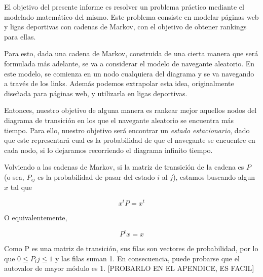 
El objetivo del presente informe es resolver un problema práctico mediante el modelado matemático del mismo. Este problema consiste en modelar páginas web y ligas deportivas con cadenas de Markov, con el objetivo de obtener rankings para ellas.

Para esto, dada una cadena de Markov, construida de una cierta manera que será formulada más adelante, se va a considerar el modelo de navegante aleatorio. En este modelo, se comienza en un nodo cualquiera del diagrama y se va navegando a trav\'es de los links. Además podemos extrapolar esta idea, originalmente diseñada para páginas web, y utilizarla en ligas deportivas.

Entonces, nuestro objetivo de alguna manera es rankear mejor aquellos nodos del diagrama de transición en los que el navegante aleatorio se encuentra más tiempo. Para ello, nuestro objetivo será encontrar un \emph{estado estacionario}, dado que este representará cual es la probabilidad de que el navegante se encuentre en cada nodo, si lo dejaramos recorriendo el diagrama infinito tiempo.

Volviendo a las cadenas de Markov, si la matriz de transición de la cadena es $P$ (o sea, $P_{ij}$ es la probabilidad de pasar del estado $i$ al $j$), estamos buscando algun $x$ tal que

\[ x^t P = x^t \]

O equivalentemente,

\[P^t x = x\]

Como P es una matriz de transición, sus filas son vectores de probabilidad, por lo que $0 \leq P_ij \leq 1$ y las filas suman 1. En consecuencia, puede probarse que el autovalor de mayor módulo es 1. [PROBARLO EN  EL APENDICE, ES FACIL]



